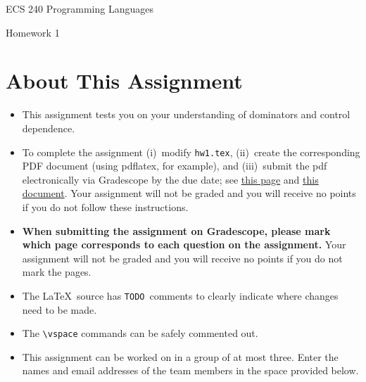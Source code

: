 \documentclass[12pt]{article}
\begin{document}
    
    \begin{center}
        \bigskip
        {\LARGE ECS 240 Programming Languages} \medskip
        
        {\Large Homework 1} \bigskip
    
    \end{center}
    
    \section*{About This Assignment}
    
    \begin{itemize}
      \item This assignment tests you on your understanding of dominators and
      control dependence.
      \item To complete the assignment (i)~modify \texttt{hw1.tex}, (ii)~create
      the corresponding PDF document (using pdflatex, for example), and
      (iii)~submit the pdf electronically via Gradescope by the due date; see
      \href{https://www.gradescope.com/get_started#student-submission}{this page}
      and
      \href{http://gradescope-static-assets.s3-us-west-2.amazonaws.com/help/submitting_hw_guide.pdf}{this
      document}. Your assignment will not be graded and you will receive no
      points if you do not follow these instructions. 

      \item \textbf{When submitting the assignment on Gradescope, please mark
      which page corresponds to each question on the assignment.}  Your
      assignment will not be graded and you will receive no points if you do not
      mark the pages.      

      \item The  \LaTeX\ source has \texttt{TODO}~comments to clearly indicate
      where changes need to be made. 
      \item The \verb=\vspace= commands can be safely commented out.
      \item This assignment can be worked on in a group of at most three. Enter
      the names and email addresses of the team members in the space provided
      below.
    \end{itemize}
\end{document}
